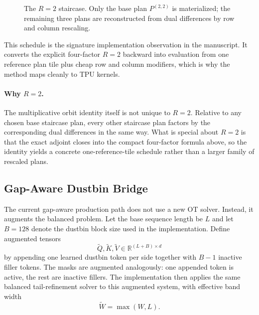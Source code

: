 \documentclass{article}
\begin{document}
\begin{figure}[h]
    \centering
    \caption{The $R=2$ staircase. Only the base plan $P^{(2,2)}$ is materialized; the remaining three plans are reconstructed from dual differences by row and column rescaling.}
    \label{fig:staircase}
\end{figure}

This schedule is the signature implementation observation in the manuscript. It converts the explicit four-factor $R=2$ backward into evaluation from one reference plan tile plus cheap row and column modifiers, which is why the method maps cleanly to TPU kernels.

\paragraph{Why \texorpdfstring{$R=2$}{R=2}.}
The multiplicative orbit identity itself is not unique to $R=2$. Relative to any chosen base staircase plan, every other staircase plan factors by the corresponding dual differences in the same way. What is special about $R=2$ is that the exact adjoint closes into the compact four-factor formula above, so the identity yields a concrete one-reference-tile schedule rather than a larger family of rescaled plans.

\subsection{Gap-Aware Dustbin Bridge}

The current gap-aware production path does not use a new OT solver. Instead, it augments the balanced problem. Let the base sequence length be $L$ and let $B=128$ denote the dustbin block size used in the implementation. Define augmented tensors
\[
\widetilde Q,\widetilde K,\widetilde V \in \mathbb{R}^{(L+B)\times d}
\]
by appending one learned dustbin token per side together with $B-1$ inactive filler tokens. The masks are augmented analogously: one appended token is active, the rest are inactive fillers. The implementation then applies the same balanced tail-refinement solver to this augmented system, with effective band width
\[
\widetilde W = \max(W,L).
\]
\end{document}
